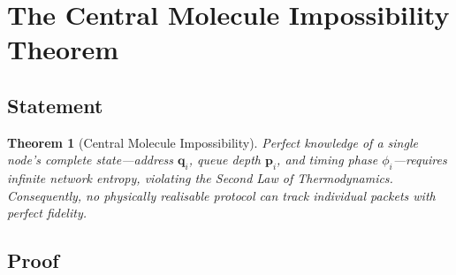 \documentclass[11pt,twocolumn,a4paper]{article}
\newtheorem{theorem}{Theorem}[section]
\theoremstyle{definition}
\theoremstyle{remark}
\begin{document}
\section{The Central Molecule Impossibility Theorem}\label{sec:central}

\subsection{Statement}\label{sec:central_statement}

\begin{theorem}[Central Molecule Impossibility]\label{thm:central}
Perfect knowledge of a single node's complete state---address $\bm{q}_i$,
queue depth $\bm{p}_i$, and timing phase $\phi_i$---requires infinite
network entropy, violating the Second Law of Thermodynamics.
Consequently, no physically realisable protocol can track individual
packets with perfect fidelity.
\end{theorem}

\subsection{Proof}\label{sec:central_proof}
\end{document}
